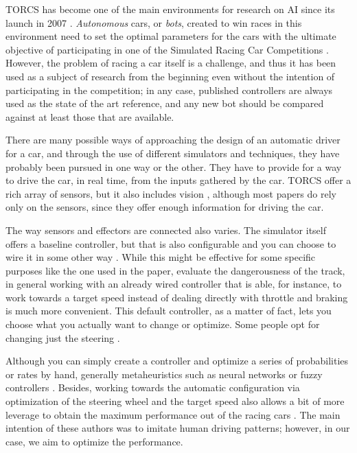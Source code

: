 \documentclass[conference]{IEEEtran}
\begin{document}
TORCS has become one of the main environments for research on AI since its launch in 2007 \cite{torcs4}. {\em Autonomous} cars, or {\em bots}, created to win races in this environment need to set the optimal parameters for the
cars \cite{Kole-ParamCarTunning12} with the ultimate objective of
participating in one of the Simulated Racing Car Competitions
\cite{SimulatedCarRacing-2008,SimulatedCarRacing-2010}. However, the
problem of racing a car itself is a challenge, and thus it has been used as a subject of research from the beginning even without the intention of
participating in the competition; in any case, published controllers
are always used as the state of the art reference, and any new bot
should be compared against at least those that are available.

There are many possible ways of approaching the design of an automatic
driver for a car, and through the use of different simulators and
techniques, they have probably been pursued in one way or the
other. They have to provide for a way to drive the car, in real time, from the inputs gathered by the car. TORCS offer a rich array of sensors, but it also includes vision \cite{zhu2018driving}, although most papers do rely only on the sensors, since they offer enough information for driving the car.

The way sensors and effectors are connected also varies. The simulator
itself offers a baseline controller, but that is also configurable and
you can choose to wire it in some other way
\cite{cussat2016dangerousness}. While this might be effective for some
specific purposes like the one used in the paper, evaluate the
dangerousness of the track, in general working with an already wired
controller that is able, for instance, to work towards a target speed
instead of dealing directly with throttle and braking is much more
convenient. This default controller, as a matter of fact, lets you
choose what you actually want to change or optimize. Some people opt for changing just the steering \cite{CarRacing_Pelta09,Nikulin:2018:EAC:3205455.3205547,LFAG}.

Although you can simply create a controller and optimize a series of
probabilities or rates by hand, generally metaheuristics such as
neural networks \cite{zhu2018driving} or fuzzy controllers
\cite{armagan2017fuzzy}. Besides, working towards the automatic
configuration via optimization of the steering wheel and the target speed also allows a bit of more leverage to obtain the maximum performance out of the
racing cars \cite{PerezEvolvingFuzzy09,Autopia2012}. The main intention of these authors was to imitate human driving patterns; however, in our case, we aim to optimize the performance.
\end{document}
